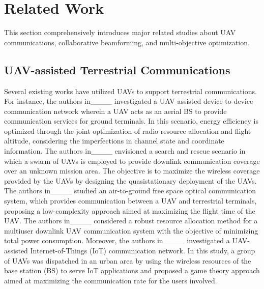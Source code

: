 \section{Related Work}
\label{sec:Related Work}

\par This section comprehensively introduces major related studies about UAV communications, collaborative beamforming, and multi-objective optimization.

\subsection{UAV-assisted Terrestrial Communications}
\label{subsec:UAV-assisted Terrestrial Communications}

\par Several existing works have utilized UAVs to support terrestrial communications. For instance, the authors in____ investigated a UAV-assisted device-to-device communication network wherein a UAV acts as an aerial BS to provide communication services for ground terminals. In this scenario, energy efficiency is optimized through the joint optimization of radio resource allocation and flight altitude, considering the imperfections in channel state and coordinate information. The authors in____ envisioned a search and rescue scenario in which a swarm of UAVs is employed to provide downlink communication coverage over an unknown mission area. The objective is to maximize the wireless coverage provided by the UAVs by designing the quasistationary deployment of the UAVs. The authors in____ studied an air-to-ground free space optical communication system, which provides communication between a UAV and terrestrial terminals, proposing a low-complexity approach aimed at maximizing the flight time of the UAV. The authors in____ considered a robust resource allocation method for a multiuser downlink UAV communication system with the objective of minimizing total power consumption. Moreover, the authors in____ investigated a UAV-assisted Internet-of-Things (IoT) communication network. In this study, a group of UAVs was dispatched in an urban area by using the wireless resources of the base station (BS) to serve IoT applications and proposed a game theory approach aimed at maximizing the communication rate for the users involved.

